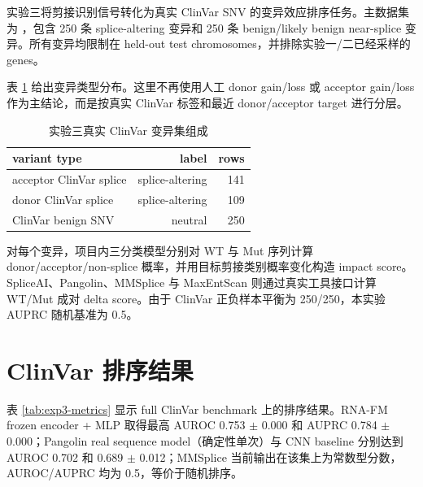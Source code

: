 \documentclass[
    oneside,
    fontset = win,
  ]{njuthesis}
\begin{document}
实验三将剪接识别信号转化为真实 ClinVar SNV 的变异效应排序任务。主数据集为 ，包含 250 条 splice-altering 变异和 250 条 benign/likely benign near-splice 变异。所有变异均限制在 held-out test chromosomes，并排除实验一/二已经采样的 genes。

表 \ref{tab:exp3-variants} 给出变异类型分布。这里不再使用人工 donor gain/loss 或 acceptor gain/loss 作为主结论，而是按真实 ClinVar 标签和最近 donor/acceptor target 进行分层。

\begin{table}[H]
  \centering
  \caption{实验三真实 ClinVar 变异集组成}
  \label{tab:exp3-variants}
  \begin{tabular}{lrr}
    \hline
    variant type & label & rows \\
    \hline
    acceptor ClinVar splice & splice-altering & 141 \\
    donor ClinVar splice & splice-altering & 109 \\
    ClinVar benign SNV & neutral & 250 \\
    \hline
  \end{tabular}
\end{table}

对每个变异，项目内三分类模型分别对 WT 与 Mut 序列计算 donor/acceptor/non-splice 概率，并用目标剪接类别概率变化构造 impact score。SpliceAI、Pangolin、MMSplice 与 MaxEntScan 则通过真实工具接口计算 WT/Mut 成对 delta score。由于 ClinVar 正负样本平衡为 250/250，本实验 AUPRC 随机基准为 0.5。

\section{ClinVar 排序结果}

表 \ref{tab:exp3-metrics} 显示 full ClinVar benchmark 上的排序结果。RNA-FM frozen encoder + MLP 取得最高 AUROC 0.753 $\pm$ 0.000 和 AUPRC 0.784 $\pm$ 0.000；Pangolin real sequence model（确定性单次）与 CNN baseline 分别达到 AUROC 0.702 和 0.689 $\pm$ 0.012；MMSplice 当前输出在该集上为常数型分数，AUROC/AUPRC 均为 0.5，等价于随机排序。
\end{document}
